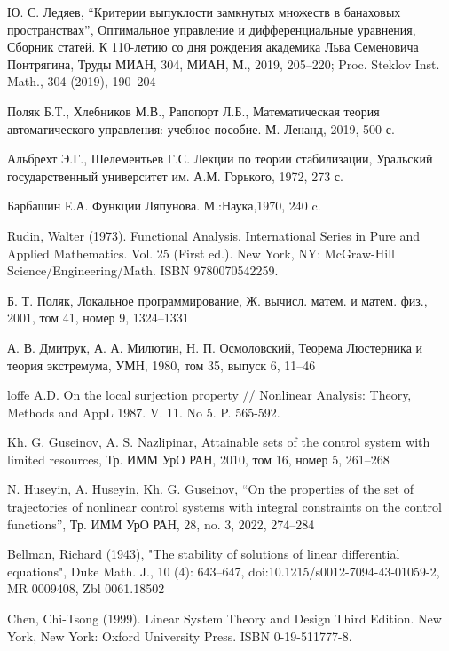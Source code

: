 \documentclass[../main.tex]{subfiles}
\begin{document}
\begin{thebibliography}{99}
 Ю. С. Ледяев, “Критерии выпуклости замкнутых множеств в банаховых пространствах”, Оптимальное управление и дифференциальные уравнения, Сборник статей. К 110-летию со дня рождения академика Льва Семеновича Понтрягина, Труды МИАН, 304, МИАН, М., 2019, 205–220; Proc. Steklov Inst. Math., 304 (2019), 190–204
 

 Поляк Б.Т., Хлебников М.В., Рапопорт Л.Б., Математическая теория автоматического управления: учебное пособие. М. Ленанд, 2019, 500 с.

 Альбрехт Э.Г., Шелементьев Г.С. Лекции по теории стабилизации, Уральский государственный университет им. А.М. Горького, 1972, 273 с.

Барбашин Е.А. Функции Ляпунова. М.:Наука,1970, 240 c.

Rudin, Walter (1973). Functional Analysis. International Series in Pure and Applied Mathematics. Vol. 25 (First ed.). New York, NY: McGraw-Hill Science/Engineering/Math. ISBN 9780070542259.

Б. Т. Поляк, Локальное программирование, Ж. вычисл. матем. и матем. физ., 2001, том 41, номер 9, 1324–1331

А. В. Дмитрук, А. А. Милютин, Н. П. Осмоловский, Теорема Люстерника и теория экстремума, УМН, 1980, том 35, выпуск 6, 11–46

loffe A.D. On the local surjection property // Nonlinear Analysis: Theory, Methods and AppL 1987. V. 11. No 5. P. 565-592.

Kh. G. Guseinov, A. S. Nazlipinar, Attainable sets of the control system with limited resources, Тр. ИММ УрО РАН, 2010, том 16, номер 5, 261–268

N. Huseyin, A. Huseyin, Kh. G. Guseinov, “On the properties of the set of trajectories of nonlinear control systems with integral constraints on the control functions”, Тр. ИММ УрО РАН, 28, no. 3, 2022, 274–284

 Bellman, Richard (1943), "The stability of solutions of linear differential equations", Duke Math. J., 10 (4): 643–647, doi:10.1215/s0012-7094-43-01059-2, MR 0009408, Zbl 0061.18502
 
Chen, Chi-Tsong (1999). Linear System Theory and Design Third Edition. New York, New York: Oxford University Press. ISBN 0-19-511777-8.


\end{thebibliography}
\end{document}
